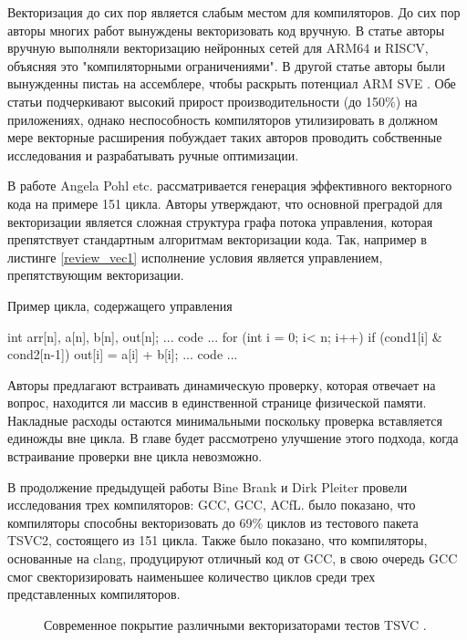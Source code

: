 Векторизация до сих пор является слабым местом для компиляторов. До сих пор  авторы многих работ вынуждены векторизовать код вручную. В статье \cite{cococcioni2021vectorizing} авторы вручную выполняли векторизацию нейронных сетей для ARM64 и RISCV, объясняя это "компиляторными ограничениями". В другой статье авторы были вынужденны пистаь на ассемблере, чтобы раскрыть потенциал ARM SVE \cite{armejach2020using}. Обе статьи подчеркивают высокий прирост производительности (до 150\%) на приложениях, однако неспособность компиляторов утилизировать в должном мере векторные расширения побуждает таких авторов проводить собственные исследования и разрабатывать ручные оптимизации.

В работе Angela Pohl etc. \cite{pohl2018control} рассматривается генерация эффективного векторного кода на примере 151 цикла. Авторы утверждают, что основной  преградой для векторизации является сложная структура графа потока управления, которая препятствует стандартным алгоритмам векторизации кода. 
 Так, например в  листинге \ref{review_vec1} исполнение условия является управлением, препятствующим векторизации. 
  \begin{ListingEnv}[!h]
 	\captiondelim{ } %
 	\caption{Пример цикла, содержащего управления}\label{review_vec1}
 	
 	\begin{Verb}
 		int arr[n], a[n],  b[n], out[n];
 		... code ...
 		for (int i = 0; i< n; i++) {
 			if (cond1[i] & cond2[n-1]){
 				out[i] = a[i] + b[i];  
 			}
 		}
 		... code ...
 	\end{Verb}
 \end{ListingEnv}
 
Авторы предлагают встраивать динамическую проверку, которая  отвечает на вопрос, находится ли массив в единственной странице физической памяти. Накладные расходы остаются минимальными поскольку проверка вставляется единожды вне цикла. В главе  будет рассмотрено улучшение этого подхода, когда встраивание проверки вне цикла невозможно.
 
В продолжение предыдущей работы Bine Brank и Dirk Pleiter \cite{brank2022assessing} провели исследования трех компиляторов: GCC, GCC, ACfL. было показано, что компиляторы способны векторизовать до 69\% циклов из тестового пакета TSVC2, состоящего из 151 цикла. Также было показано, что компиляторы, основанные на clang, продуцируют отличный код от GCC, в свою очередь GCC смог свекторизировать наименьшее количество циклов среди трех представленных компиляторов.
 \begin{figure}[htbp]
 	\centering
 	
 	\caption{Современное покрытие различными векторизаторами тестов TSVC \cite{brank2022assessing}.}
 	\label{partReview:vectorization}
 \end{figure}
 
